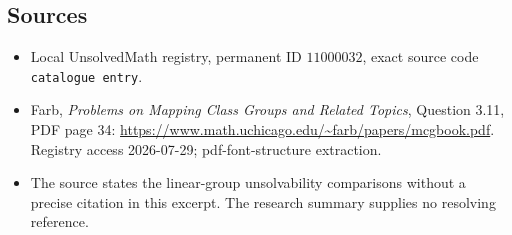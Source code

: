 \documentclass[11pt]{article}
\begin{document}
\subsection{Sources}
\begin{itemize}
\item Local UnsolvedMath registry, permanent ID \(11000032\), exact source code \texttt{catalogue entry}.
\item Farb, \emph{Problems on Mapping Class Groups and Related Topics}, Question 3.11, PDF page 34: \url{https://www.math.uchicago.edu/~farb/papers/mcgbook.pdf}. Registry access 2026-07-29; pdf-font-structure extraction.
\item The source states the linear-group unsolvability comparisons without a precise citation in this excerpt. The research summary supplies no resolving reference.
\end{itemize}
\end{document}
